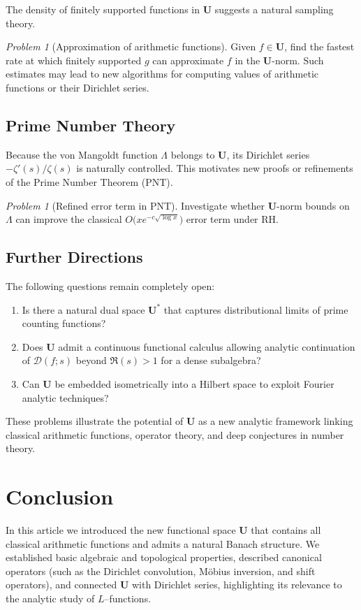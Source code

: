 \documentclass[11pt,a4paper]{article}
\theoremstyle{plain}
\theoremstyle{definition}
\theoremstyle{remark}
\newtheorem{problem}[theorem]{Problem}
\begin{document}
The density of finitely supported functions in $\mathbf{U}$
suggests a natural sampling theory.

\begin{problem}[Approximation of arithmetic functions]
	Given $f\in\mathbf{U}$, find the fastest rate
	at which finitely supported $g$ can approximate $f$
	in the $\mathbf{U}$-norm.
	Such estimates may lead to new algorithms for computing
	values of arithmetic functions or their Dirichlet series.
\end{problem}

\subsection{Prime Number Theory}

Because the von Mangoldt function $\Lambda$ belongs to $\mathbf{U}$,
its Dirichlet series $-\zeta'(s)/\zeta(s)$ is naturally controlled.
This motivates new proofs or refinements of the Prime Number Theorem (PNT).

\begin{problem}[Refined error term in PNT]
	Investigate whether $\mathbf{U}$-norm bounds on $\Lambda$
	can improve the classical $O\bigl(x e^{-c\sqrt{\log x}}\bigr)$
	error term under RH.
\end{problem}

\subsection{Further Directions}

The following questions remain completely open:

\begin{enumerate}
	\item Is there a natural dual space $\mathbf{U}^*$ that captures
	distributional limits of prime counting functions?
	\item Does $\mathbf{U}$ admit a continuous functional calculus
	allowing analytic continuation of $\mathcal{D}(f;s)$ beyond $\Re(s)>1$
	for a dense subalgebra?
	\item Can $\mathbf{U}$ be embedded isometrically into
	a Hilbert space to exploit Fourier analytic techniques?
\end{enumerate}

These problems illustrate the potential of $\mathbf{U}$
as a new analytic framework linking classical arithmetic functions,
operator theory, and deep conjectures in number theory.
\section{Conclusion}
In this article we introduced the new functional space $\mathbf{U}$ that
contains all classical arithmetic functions and admits a natural Banach
structure.  
We established basic algebraic and topological properties, described
canonical operators (such as the Dirichlet convolution, Möbius inversion,
and shift operators), and connected $\mathbf{U}$ with Dirichlet series,
highlighting its relevance to the analytic study of $L$–functions.
\end{document}
